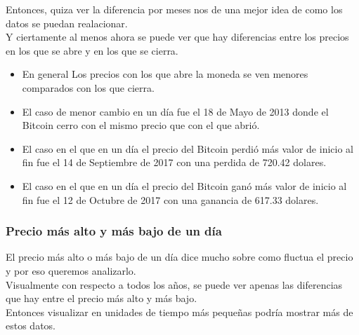 \documentclass[12pt,letterpaper]{article}
\begin{document}
    Entonces, quiza ver la diferencia por meses nos de una mejor idea de como los datos se puedan realacionar.
    \\

    Y ciertamente al menos ahora se puede ver que hay diferencias entre los precios en los que se abre y en los que se cierra.
    \\

    \begin{itemize}

        \item En general Los precios con los que abre la moneda se ven menores comparados con los que cierra.

        \item El caso de menor cambio en un d\'ia fue el 18 de Mayo de 2013 donde el Bitcoin cerro con el mismo precio que con el que abri\'o.

        \item El caso en el que en un d\'ia el precio del Bitcoin perdi\'o m\'as valor de inicio al fin fue el 14 de Septiembre de 2017 con una perdida de 720.42 dolares.

        \item El caso en el que en un d\'ia el precio del Bitcoin gan\'o m\'as valor de inicio al fin fue el 12 de Octubre de 2017 con una ganancia de 617.33 dolares.

    \end{itemize}


    \subsubsection*{Precio más alto y más bajo de un día}

    El precio m\'as alto o m\'as bajo de un d\'ia dice mucho sobre como fluctua el precio y por eso queremos analizarlo.
    \\

    Visualmente con respecto a todos los a\~nos, se puede ver apenas las diferencias que hay entre el precio m\'as alto y m\'as bajo.
    \\


    Entonces visualizar en unidades de tiempo m\'as peque\~nas podr\'ia mostrar m\'as de estos datos.
\end{document}
